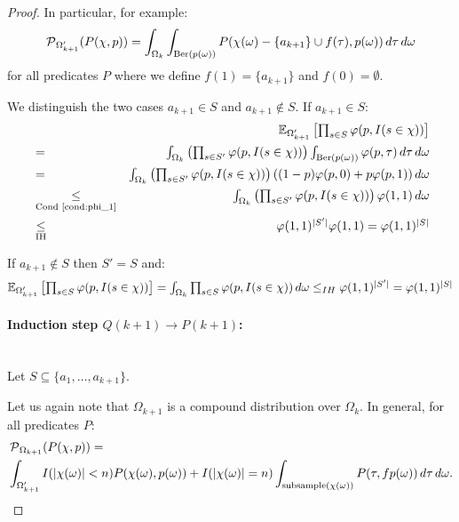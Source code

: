 \begin{proof}
In particular, for example:
\[
\operatorname{\mathcal P}_{\Omega'_{k+1}}( P(\chi, p) ) = \int_{\Omega_k} \int_{\textrm{Ber}(p(\omega))} 
P(\chi(\omega)-\{a_{k+1}\}\cup f(\tau), p(\omega)) \, d \tau \, d \omega
\]
for all predicates $P$ where we define $f(1) = \{a_{k+1}\}$ and $f(0) = \emptyset$.

We distinguish the two cases $a_{k+1} \in S$ and $a_{k+1} \notin S$. If $a_{k+1} \in S$:
\begin{eqnarray*}
  & & \textstyle \operatorname{\mathbb E}_{\Omega'_{k+1}}\left[\prod_{s \in S} \varphi(p, I(s \in \chi)) \right] \\
 & = & \textstyle \int_{\Omega_k} \left(\prod_{s \in S'} \varphi(p, I(s \in \chi))\right)
  \int_{\mathrm{Ber}(p(\omega))} \varphi(p, \tau) \, d \tau \, d \omega \\
  & = & \textstyle \int_{\Omega_k} \left(\prod_{s \in S'} \varphi(p, I(s \in \chi))\right) ((1-p) \varphi(p,0) + 
  p \varphi(p,1)) \, d \omega\\
  & \underset{\textrm{Cond~\ref{cond:phi_1}}}{\leq} & \textstyle \int_{\Omega_k} \left( \prod_{s \in S'} 
  \varphi(p, I(s \in \chi)) \right) \varphi(1,1) \, d \omega \\
  & \underset{\textrm{IH}}{\leq} & \textstyle \varphi(1,1)^{|S'|} \varphi(1,1) = \varphi(1,1)^{|S|}
\end{eqnarray*}

If $a_{k+1} \notin S$ then $S' = S$ and:
\[
  \textstyle \operatorname{\mathbb E}_{\Omega'_{k+1}}\left[\prod_{s \in S} \varphi(p, I(s \in \chi)) \right] =
  \int_{\Omega_k} \prod_{s \in S} \varphi(p, I(s \in \chi)) \, d \omega \leq_{IH} \varphi(1,1)^{|S'|} =
  \varphi(1,1)^{|S|}
\]
\paragraph{Induction step $Q(k+1) \rightarrow P(k+1)$:} \phantom{.}\\
Let $S \subseteq \{ a_1, \ldots, a_{k+1} \}$.

Let us again note that $\Omega_{k+1}$ is a compound distribution over $\Omega_k$. In general, for 
all predicates $P$:
\begin{align*}
  & \operatorname{\mathcal P}_{\Omega_{k+1}}( P(\chi, p) ) = \\
  & \int_{\Omega'_{k+1}} I( |\chi(\omega)|<n ) P(\chi(\omega),p(\omega)) +
  I( |\chi(\omega)|=n ) \int_{\mathrm{subsample}(\chi(\omega))}
  P(\tau, f p(\omega)) \, d \tau \, d \omega \textrm{.}
\end{align*}


\end{proof}
